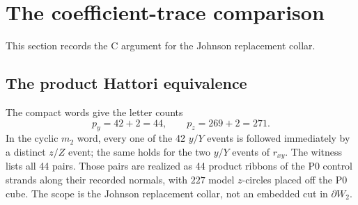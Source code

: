 \section{The coefficient-trace comparison}\label{sec:c-comparison}

This section records the C argument for the Johnson replacement collar.

\subsection{The product Hattori equivalence}

The compact words give the letter counts
\[
p_y=42+2=44,\qquad p_z=269+2=271.
\]
In the cyclic $m_2$ word, every one of the 42
$y/Y$ events is followed immediately by a distinct $z/Z$ event; the same
holds for the two $y/Y$ events of $r_{xy}$.  The witness lists all 44 pairs.
Those pairs are realized as 44 product ribbons of the P0 control
strands along their recorded normals, with $227$ model $z$-circles placed
off the P0 cube.  The scope is the Johnson replacement collar, not an
embedded cut in $\partial W_2$.

